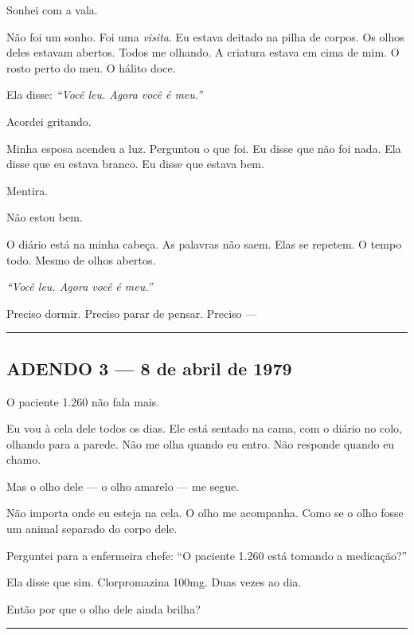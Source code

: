 \noindent Sonhei com a vala.

\noindent Não foi um sonho. Foi uma \textit{visita}. Eu estava deitado na pilha de corpos. Os olhos deles estavam abertos. Todos me olhando. A criatura estava em cima de mim. O rosto perto do meu. O hálito doce.

\noindent Ela disse: \textit{\textquotedblleft{}Você leu. Agora você é meu.\textquotedblright{}}

\noindent Acordei gritando.

\noindent Minha esposa acendeu a luz. Perguntou o que foi. Eu disse que não foi nada. Ela disse que eu estava branco. Eu disse que estava bem.

\noindent Mentira.

\noindent Não estou bem.

\noindent O diário está na minha cabeça. As palavras não saem. Elas se repetem. O tempo todo. Mesmo de olhos abertos.

\noindent \textit{\textquotedblleft{}Você leu. Agora você é meu.\textquotedblright{}}

\noindent Preciso dormir. Preciso parar de pensar. Preciso ---

\vspace{0.5em}\noindent\rule{\textwidth}{0.5pt}\vspace{0.5em}

\subsection*{ADENDO 3 --- 8 de abril de 1979}

\noindent O paciente 1.260 não fala mais.

\noindent Eu vou à cela dele todos os dias. Ele está sentado na cama, com o diário no colo, olhando para a parede. Não me olha quando eu entro. Não responde quando eu chamo.

\noindent Mas o olho dele --- o olho amarelo --- me segue.

\noindent Não importa onde eu esteja na cela. O olho me acompanha. Como se o olho fosse um animal separado do corpo dele.

\noindent Perguntei para a enfermeira chefe: \textquotedblleft{}O paciente 1.260 está tomando a medicação?\textquotedblright{}

\noindent Ela disse que sim. Clorpromazina 100mg. Duas vezes ao dia.

\noindent Então por que o olho dele ainda brilha?

\vspace{0.5em}\noindent\rule{\textwidth}{0.5pt}\vspace{0.5em}

